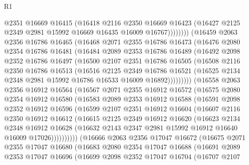 \begin{lexlean}{R1}
\begin{coremodule}
                @2351
                @16669
                @16415
                (@16418
                  @2116
                  @2350
                  @16669
                  @16423
                  (@16427 @2125 @2349 @2981 @15992 @16669 @16435 @16009 @16767))))))))
    (@16459
      @2063
      @2356
      @16786
      @16465
      (@16468
        @2071
        @2355
        @16786
        @16473
        (@16476
          @2080
          @2354
          @16786
          @16481
          (@16484
            @2089
            @2353
            @16786
            @16489
            (@16492
              @2098
              @2352
              @16786
              @16497
              (@16500
                @2107
                @2351
                @16786
                @16505
                (@16508
                  @2116
                  @2350
                  @16786
                  @16513
                  (@16516
                    @2125
                    @2349
                    @16786
                    @16521
                    (@16525 @2134 @2348 @2981 @15992 @16786 @16533 @16009 @16892)))))))))
    (@16558
      @2063
      @2356
      @16912
      @16564
      (@16567
        @2071
        @2355
        @16912
        @16572
        (@16575
          @2080
          @2354
          @16912
          @16580
          (@16583
            @2089
            @2353
            @16912
            @16588
            (@16591
              @2098
              @2352
              @16912
              @16596
              (@16599
                @2107
                @2351
                @16912
                @16604
                (@16607
                  @2116
                  @2350
                  @16912
                  @16612
                  (@16615
                    @2125
                    @2349
                    @16912
                    @16620
                    (@16623
                      @2134
                      @2348
                      @16912
                      @16628
                      (@16632 @2143 @2347 @2981 @15992 @16912 @16640 @16009 @17026))))))))))
    (@16666
      @2063
      @2356
      @17047
      @16672
      (@16675
        @2071
        @2355
        @17047
        @16680
        (@16683
          @2080
          @2354
          @17047
          @16688
          (@16691
            @2089
            @2353
            @17047
            @16696
            (@16699
              @2098
              @2352
              @17047
              @16704
              (@16707
                @2107

\end{coremodule}
\end{lexlean}

